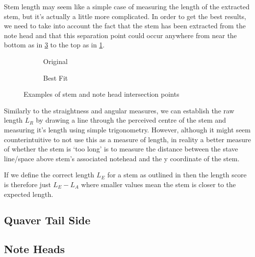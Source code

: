 Stem length may seem like a simple case of measuring the length of the extracted stem, but it's actually a little more complicated. In order to get the best results, we need to take into account the fact that the stem has been extracted from the note head and that this separation point could occur anywhere from near the bottom as in \cref{fig:stem-separation-bottom} to the top as in \cref{fig:stem-separation-top}.

\begin{figure}[h!]
    \centering

    \begin{subfigure}[b]{.3\linewidth}
        \centering
        \caption{Original}
        \label{fig:stem-separation-top}
    \end{subfigure}
    \begin{subfigure}[b]{.3\linewidth}
        \centering
        \caption{Best Fit}
        \label{fig:stem-separation-bottom}
    \end{subfigure}

    \caption{Examples of stem and note head intersection points}
\end{figure}

Similarly to the straightness and angular measures, we can establish the raw length $L_R$ by drawing a line through the perceived centre of the stem and measuring it's length using simple trigonometry. However, although it might seem counterintuitive to not use this as a measure of length, in reality a better measure of whether the stem is `too long' is to measure the distance between the stave line/space above stem's associated notehead and the y coordinate of the stem.

If we define the correct length $L_E$ for a stem as outlined in  then the length score is therefore just $L_E - L_A$ where smaller values mean the stem is closer to the expected length.

\subsection{Quaver Tail Side}

\subsection{Note Heads}
